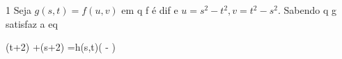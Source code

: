 \documentclass[\mainfilename]{subfiles}
\begin{document}
\begin{questionBox}1{ %
    Seja \(g(s,t)=f(u,v)\) em q f é dif e \(u=s^2-t^2,v=t^2-s^2\). Sabendo q g satisfaz a eq
} %
    \begin{BM}
        (t+2)
        +(s+2)
        =h(s,t)\left(
            -
        \right)
    \end{BM}


\end{questionBox}
\end{document}
